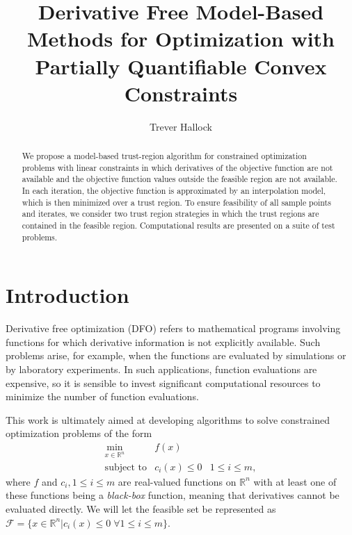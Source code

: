 \documentclass{article}
\title{Derivative Free Model-Based Methods for Optimization with Partially Quantifiable Convex Constraints}
\author{Trever Hallock}
\theoremstyle{case}
\numberwithin{theorem}{subsection}
\newcommand{\domain}{{\mathcal X}}
\newcommand{\feasible}{{\mathcal F}}
\newcommand{\Rn}{\mathbb R^n}
\begin{document}
\maketitle

\begin{abstract}

We propose a model-based trust-region algorithm for constrained optimization problems with linear constraints in which derivatives of the objective function are not available and the objective function values outside the feasible region are not available.
In each iteration, the objective function is approximated by an interpolation model, which is then minimized over a trust region.
To ensure feasibility of all sample points and iterates, we consider two trust region strategies in which the trust regions are contained in the feasible region.
Computational results are presented on a suite of test problems.

\end{abstract}

\newpage

\tableofcontents

\newpage


\section{Introduction}

Derivative free optimization (DFO) refers to mathematical programs involving functions for which derivative information is not explicitly available.
Such problems arise, for example, when the functions are evaluated by simulations or by laboratory experiments.
In such applications, function evaluations are expensive, so it is sensible to invest significant computational resources to minimize the number of function evaluations.

This work is ultimately aimed at developing algorithms to solve constrained optimization problems of the form 
\[ \begin{array}{ccl} \min_{x \in \Rn} & f(x) \\
\mbox{subject to} & c_i(x) \le 0 & 1 \le i \le m,
\end{array}
\]
where 
$f$ and $c_i, 1 \le i \le m$ are real-valued functions on $\Rn$ with at least one of these functions being a {\em black-box} function, meaning that derivatives cannot be evaluated directly.
We will let the feasible set be represented as $\feasible = \{x \in \Rn | c_i(x) \le 0 \; \forall 1 \le i \le m \}$.
\end{document}
